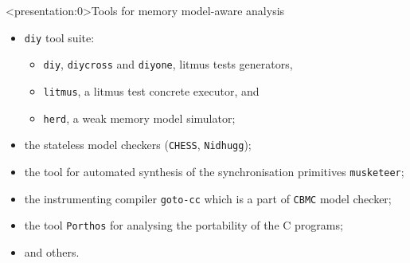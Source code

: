 \documentclass[aspectratio=149]{beamer}
\newcommand{\tool}[1]{\texttt{#1}}
\begin{document}
\begin{frame}<presentation:0>{Tools for memory model-aware analysis}
\begin{itemize}
\item \texttt{diy} tool suite:
  \begin{itemize}
  \item \tool{diy}, \tool{diycross} and \tool{diyone}, litmus tests generators,
  \item \tool{litmus}, a litmus test concrete executor, and 
  \item \tool{herd}, a weak memory model simulator;
  \end{itemize}
\item the stateless model checkers (\tool{CHESS}, \tool{Nidhugg}); %
\item the tool for automated synthesis of the synchronisation primitives \tool{musketeer};
\item the instrumenting compiler \tool{goto-cc} which is a part of \tool{CBMC} model checker;
\item the tool \texttt{Porthos} for analysing the portability of the C programs;
\item and others.
\end{itemize}
\end{frame}
\end{document}
